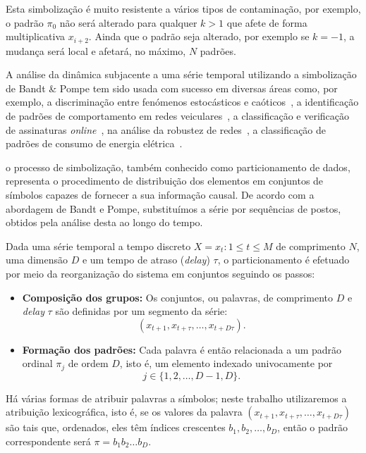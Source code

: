 Esta simbolização é muito resistente a vários tipos de contaminação, por exemplo, o padrão $\pi_0$ não será alterado para qualquer $k>1$ que afete de forma multiplicativa $x_{i+2}$.
Ainda que o padrão seja alterado, por exemplo se $k=-1$, a mudança será local e afetará, no máximo, $N$ padrões.
 
A análise da dinâmica subjacente a uma série temporal utilizando a simbolização de Bandt \& Pompe tem sido usada com sucesso em diversas áreas como, por exemplo, 
a discriminação entre fenómenos estocásticos e caóticos~\cite{DistinguishingNoiseFromChaos}, 
a identificação de padrões de comportamento em redes veiculares~\cite{CharacterizationVehicleBehaviorInformationTheory},
a classificação e verificação de assinaturas \textit{online}~\cite{ClassificationVerificationOnlineHandwrittenSignatures},
na análise da robustez de redes~\cite{InformationTheoryPerspectiveNetworkRobustness},
a classificação de padrões de consumo de energia elétrica~\cite{CharacterizationElectricLoadInformationTheoryQuantifiers}.

o processo de simbolização, também conhecido como particionamento de dados, representa o procedimento de distribuição dos elementos em conjuntos de símbolos capazes de fornecer a sua informação causal. 
De acordo com a abordagem de Bandt e Pompe, substituímos a série por sequências de postos, obtidos pela análise desta ao longo do tempo.

Dada uma série temporal a tempo discreto $X = {x_t:1\leq t\leq M}$ de comprimento $N$, uma dimensão $D$ e um tempo de atraso (\textit{delay}) $\tau$, o particionamento é efetuado por meio da reorganização do sistema em conjuntos seguindo os passos:
\begin{itemize}
	\item \textbf{Composição dos grupos:} Os conjuntos, ou palavras, de comprimento $D$ e \textit{delay} $\tau$ são definidas por um segmento da série: 
	 $$ (x_{t+1},x_{t+\tau},\ldots, x_{t+D\tau}).$$ 

	\item \textbf{Formação dos padrões: } Cada palavra é então relacionada a um padrão ordinal $\pi_j$ de ordem $D$, isto é, um elemento indexado univocamente por
	$$ j\in\{1, 2,\ldots, D-1, D\}. $$
\end{itemize}

Há várias formas de atribuir palavras a símbolos; neste trabalho utilizaremos a atribuição lexicográfica, isto é, se os valores da palavra $(x_{t+1},x_{t+\tau},\ldots, x_{t+D\tau})$ são tais que, ordenados, eles têm índices crescentes $b_1,b_2,\dots,b_D$, então o padrão correspondente será $\pi=b_1b_2\dots b_D$.

